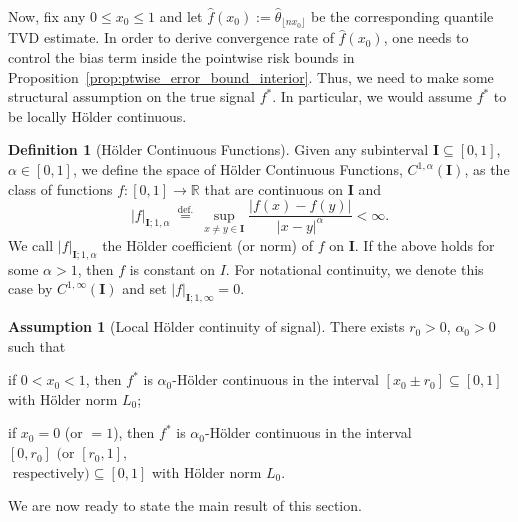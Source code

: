 \documentclass[11pt]{article}
\theoremstyle{plain}
\theoremstyle{definition}
\newtheorem{definition}[theorem]{Definition}
\newtheorem{assumption}{Assumption}
\theoremstyle{remark}
\begin{document}
    \noindent Now, fix any $0\leq x_0\leq 1$ and let $\hat{f}(x_0):=\hat{\theta}_{\lfloor nx_0\rfloor}$ be the corresponding quantile TVD estimate. In order to derive convergence rate of $\hat{f}(x_0)$, one needs to control the bias term inside the pointwise risk bounds in Proposition~\ref{prop:ptwise_error_bound_interior}. Thus, we need to make some structural assumption on the true signal $f^*$. In particular, we would assume $f^*$ to be locally H\"{o}lder continuous.
\begin{definition}[H\"{o}lder Continuous Functions]
    Given any subinterval $\mathbf{I} \subseteq[0,1]$, $\alpha \in[0,1]$,  we define the space of H\"{o}lder Continuous Functions, $C^{1, \alpha}(\mathbf{I})$, as the class of functions $f:[0,1] \rightarrow \mathbb{R}$ that are continuous on $\mathbf{I}$ and 
$$
|f|_{\mathbf{I} ; 1, \alpha} \stackrel{\text { def. }}{=} \sup _{x \neq y \in \mathbf{I}} \frac{\left|f(x)-f(y)\right|}{|x-y|^\alpha}<\infty .
$$
We call $|f|_{\mathbf{I} ; 1, \alpha}$ the H\"{o}lder coefficient (or norm) of $f$ on $\mathbf{I}$. If the above holds for some $\alpha>1$, then $f$ is constant on $I$. For notational continuity, we denote this case by $C^{1, \infty}(\mathbf{I})$ and set $|f|_{\mathbf{I} ; 1, \infty}=0$.
\end{definition}  
\begin{assumption}[Local H\"{o}lder continuity of signal]\label{ass:holder_cts}
There exists $r_0>0$, $\alpha_0>0$ such that
\begin{list}{}{%
    \setlength{\leftmargin}{\labelwidth}
    \addtolength{\leftmargin}{\labelsep}
}
    \item[\textit{Interior Point:}] if $0<x_0<1$, then $f^*$ is $\alpha_0$-H\"{o}lder continuous in the interval $[x_0\pm r_0]\subseteq [0,1]$ with H\"{o}lder norm $L_0$;
    \item[\textit{Boundary Points:}] if $x_0=0$ (or $=1$), then $f^*$ is $\alpha_0$-H\"{o}lder continuous in the interval $[0, r_0]\text{ (or }[r_0,1],$\\
    $\text{ respectively}) \subseteq [0,1]$ with H\"{o}lder norm $L_0$.
\end{list}
\end{assumption}
    We are now ready to state the main result of this section.
\end{document}
